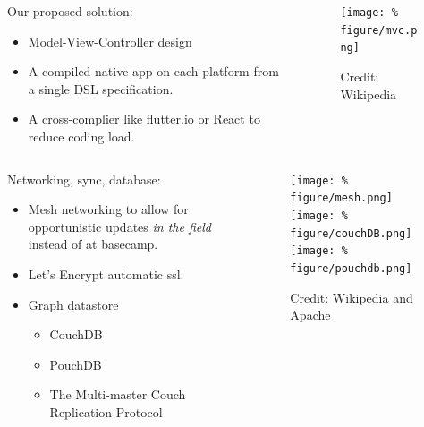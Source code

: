 \documentclass[unknownkeysallowed,usepdftitle=false, parskip=full, t]{beamer}
\newcommand{\secvariable}{nothing}
\newcommand{\mysection}[1]{\renewcommand{\secvariable}{#1}
}
\begin{document}
\mysection{solution}
\begin{frame}\label{\secvariable}
\begin{columns}[onlytextwidth]
	\begin{column}[c]{0.50\textwidth}
\parbox{\linewidth}{

Our proposed solution:

\begin{itemize}
\item Model-View-Controller design
\item A compiled native app on each platform from a single DSL specification.
\item A cross-complier like flutter.io or React to reduce coding load. 

\end{itemize}
}
\end{column}
\begin{column}[c]{0.45\textwidth}
\begin{figure}
\texttt{[image: \%
figure/mvc.png]}
\caption{Credit: Wikipedia}
\end{figure}
  \end{column}

\end{columns}


\end{frame}
\begin{frame}[t]
\begin{columns}[onlytextwidth]
	\begin{column}[c]{0.50\textwidth}
\parbox{\linewidth}{

Networking, sync, database:

\begin{itemize}
\item Mesh networking to allow for opportunistic updates \textit{in the field} instead of at basecamp.
\item Let's Encrypt automatic ssl.
\item Graph datastore
\begin{itemize}
\item CouchDB
\item PouchDB
\item The Multi-master Couch Replication Protocol
\end{itemize}
\end{itemize}
}
\end{column}
\begin{column}[c]{0.45\textwidth}
\begin{figure}

\vspace{12pt}
\texttt{[image: \%
figure/mesh.png]}\\
\texttt{[image: \%
figure/couchDB.png]} \hspace{1mm} 
\texttt{[image: \%
figure/pouchdb.png]}
\vspace{12 pt}
\caption{Credit: Wikipedia and Apache}
\end{figure}
  \end{column}

\end{columns}


\end{frame}
\end{document}
